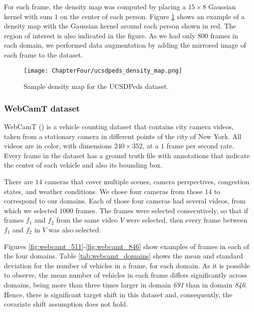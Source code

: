For each frame, the density map was computed by placing a $15 \times 8$ Gaussian kernel with sum $1$ on the center of each person. Figure \ref{fig:ucsdpeds_density_map} shows an example of a density map with the Gaussian kernel around each person shown in red. The region of interest is also indicated in the figure. As we had only $800$ frames in each domain, we performed data augmentation by adding the mirrored image of each frame to the dataset.

\begin{figure}[!ht]
    \centering
    \texttt{[image: ChapterFour/ucsdpeds\_density\_map.png]}
    \caption{Sample density map for the UCSDPeds dataset.}
    \label{fig:ucsdpeds_density_map}
\end{figure}

\subsubsection{WebCamT dataset}
\label{sec:da_sensors_webcamt}

WebCamT (\citet{Zhang2017b}) is a vehicle counting dataset that contains city camera videos, taken from a stationary camera in different points of the city of New York. All videos are in color, with dimensions $240 \times 352$, at a $1$ frame per second rate. Every frame in the dataset has a ground truth file with annotations that indicate the center of each vehicle and also its bounding box.

There are $14$ cameras that cover multiple scenes, camera perspectives, congestion states, and weather conditions. We chose four cameras from those $14$ to correspond to our domains. Each of those four cameras had several videos, from which we selected $1000$ frames. The frames were selected consecutively, so that if frames $f_1$ and $f_2$ from the same video $V$ were selected, then every frame between $f_1$ and $f_2$ in $V$ was also selected.

Figures \ref{fig:webcamt_511}-\ref{fig:webcamt_846} show examples of frames in each of the four domains. Table \ref{tab:webcamt_domains} shows the mean and standard deviation for the number of vehicles in a frame, for each domain. As it is possible to observe, the mean number of vehicles in each frame differs significantly across domains, being more than three times larger in domain \textit{691} than in domain \textit{846}. Hence, there is significant target shift in this dataset and, consequently, the covariate shift assumption does not hold.

